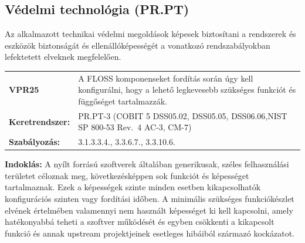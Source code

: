 \documentclass[12pt,magyar,a4paper,oneside]{scrreprt}
\begin{document}
\hypertarget{vuxe9delmi-technoluxf3gia-pr.pt}{%
\subsection{Védelmi technológia
(PR.PT)}\label{vuxe9delmi-technoluxf3gia-pr.pt}}

Az alkalmazott technikai védelmi megoldások képesek biztosítani a
rendszerek és eszközök biztonságát és ellenállóképességét a vonatkozó
rendszabályokban lefektetett elveknek megfelelően.

\begin{longtable}[]{@{}ll@{}}
\toprule
\endhead
\begin{minipage}[t]{0.16\columnwidth}\raggedright
\textbf{VPR25}\strut
\end{minipage} & \begin{minipage}[t]{0.79\columnwidth}\raggedright
A FLOSS komponenseket fordítás során úgy kell konfigurálni, hogy a
lehető legkevesebb szükséges funkciót és függőséget tartalmazzák.\strut
\end{minipage}\tabularnewline
\begin{minipage}[t]{0.16\columnwidth}\raggedright
\textbf{Keretrendszer:}\strut
\end{minipage} & \begin{minipage}[t]{0.79\columnwidth}\raggedright
PR.PT-3 (COBIT 5 DSS05.02, DSS05.05, DSS06.06,NIST SP 800-53 Rev.~4
AC-3, CM-7)\strut
\end{minipage}\tabularnewline
\begin{minipage}[t]{0.16\columnwidth}\raggedright
\textbf{Szabályozás:}\strut
\end{minipage} & \begin{minipage}[t]{0.79\columnwidth}\raggedright
3.1.3.3.4., 3.3.6.7., 3.3.10.6.\strut
\end{minipage}\tabularnewline
\bottomrule
\end{longtable}

\textbf{Indoklás: } A nyílt forrású szoftverek általában generikusak,
széles felhasználási területet céloznak meg, következésképpen sok
funkciót és képességet tartalmaznak. Ezek a képességek szinte minden
esetben kikapcsolhatók konfigurációs szinten vagy fordítási időben. A
minimális szükséges funkciókészlet elvének értelmében valamennyi nem
használt képességet ki kell kapcsolni, amely hatékonyabbá teheti a
szoftver működését és egyben csökkenti a kikapcsolt funkció és annak
upstream projektjeinek esetleges hibáiból származó kockázatot.
\end{document}
